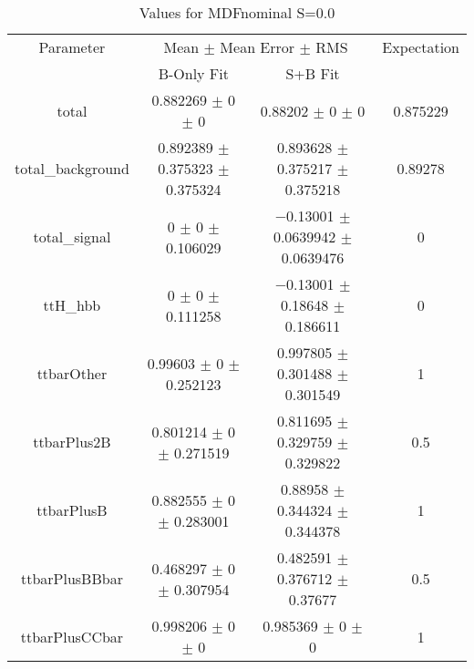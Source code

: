\begin{table}
\centering
\caption{Values for MDFnominal S=0.0}
\begin{tabular}{cccc}
\toprule
Parameter & \multicolumn{2}{c}{Mean $\pm$ Mean Error $\pm$ RMS} & Expectation\\
 & B-Only Fit & S+B Fit & \\
\midrule
total & \num{0.882269} $\pm$ \num{0} $\pm$ \num{0} & \num{0.88202} $\pm$ \num{0} $\pm$ \num{0} & \num{0.875229}\\
total\_background & \num{0.892389} $\pm$ \num{0.375323} $\pm$ \num{0.375324} & \num{0.893628} $\pm$ \num{0.375217} $\pm$ \num{0.375218} & \num{0.89278}\\
total\_signal & \num{0} $\pm$ \num{0} $\pm$ \num{0.106029} & \num{-0.13001} $\pm$ \num{0.0639942} $\pm$ \num{0.0639476} & \num{0}\\
ttH\_hbb & \num{0} $\pm$ \num{0} $\pm$ \num{0.111258} & \num{-0.13001} $\pm$ \num{0.18648} $\pm$ \num{0.186611} & \num{0}\\
ttbarOther & \num{0.99603} $\pm$ \num{0} $\pm$ \num{0.252123} & \num{0.997805} $\pm$ \num{0.301488} $\pm$ \num{0.301549} & \num{1}\\
ttbarPlus2B & \num{0.801214} $\pm$ \num{0} $\pm$ \num{0.271519} & \num{0.811695} $\pm$ \num{0.329759} $\pm$ \num{0.329822} & \num{0.5}\\
ttbarPlusB & \num{0.882555} $\pm$ \num{0} $\pm$ \num{0.283001} & \num{0.88958} $\pm$ \num{0.344324} $\pm$ \num{0.344378} & \num{1}\\
ttbarPlusBBbar & \num{0.468297} $\pm$ \num{0} $\pm$ \num{0.307954} & \num{0.482591} $\pm$ \num{0.376712} $\pm$ \num{0.37677} & \num{0.5}\\
ttbarPlusCCbar & \num{0.998206} $\pm$ \num{0} $\pm$ \num{0} & \num{0.985369} $\pm$ \num{0} $\pm$ \num{0} & \num{1}\\
\bottomrule
\end{tabular}
\end{table}